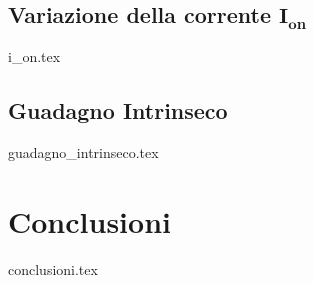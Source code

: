 \documentclass[
	a4paper,
	cleardoublepage=empty,
	headings=twolinechapter,
	numbers=autoenddot,
]{scrbook}
\begin{document}
\section[Variazione della corrente $I_{on}$]{Variazione della corrente $\bm{I_{on}}$}
{i_on.tex}

\section{Guadagno Intrinseco}
{guadagno_intrinseco.tex}


\chapter*{Conclusioni}
{conclusioni.tex}

\backmatter




\end{document}
